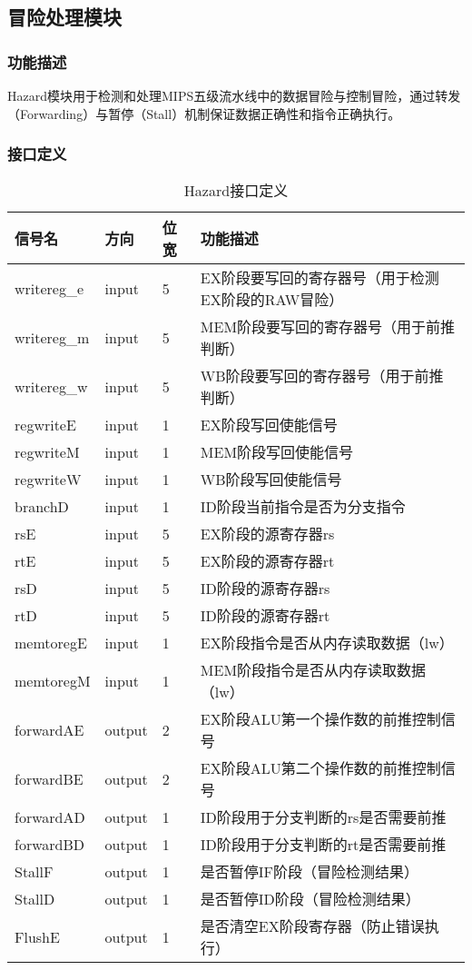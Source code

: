 \subsection{冒险处理模块}\label{sub:hazard}
\subsubsection{功能描述}
Hazard模块用于检测和处理MIPS五级流水线中的数据冒险与控制冒险，通过转发（Forwarding）与暂停（Stall）机制保证数据正确性和指令正确执行。
\subsubsection{接口定义}
\begin{table}[H]
\caption{Hazard接口定义}\label{tab:signaldef}
\begin{center}
	\begin{tabular}{|l|l|l|p{6cm}|}
	\hline
	\textbf{信号名} & \textbf{方向} & \textbf{位宽} & \textbf{功能描述}\\ \hline \hline
writereg\_e & input & 5 & EX阶段要写回的寄存器号（用于检测EX阶段的RAW冒险） \\
writereg\_m & input & 5 & MEM阶段要写回的寄存器号（用于前推判断） \\
writereg\_w & input & 5 & WB阶段要写回的寄存器号（用于前推判断） \\
regwriteE & input & 1 & EX阶段写回使能信号 \\
regwriteM & input & 1 & MEM阶段写回使能信号 \\
regwriteW & input & 1 & WB阶段写回使能信号 \\
branchD & input & 1 & ID阶段当前指令是否为分支指令 \\
rsE & input & 5 & EX阶段的源寄存器rs \\
rtE & input & 5 & EX阶段的源寄存器rt \\
rsD & input & 5 & ID阶段的源寄存器rs \\
rtD & input & 5 & ID阶段的源寄存器rt \\
memtoregE & input & 1 & EX阶段指令是否从内存读取数据（lw） \\
memtoregM & input & 1 & MEM阶段指令是否从内存读取数据（lw） \\
forwardAE & output & 2 & EX阶段ALU第一个操作数的前推控制信号 \\
forwardBE & output & 2 & EX阶段ALU第二个操作数的前推控制信号 \\
forwardAD & output & 1 & ID阶段用于分支判断的rs是否需要前推 \\
forwardBD & output & 1 & ID阶段用于分支判断的rt是否需要前推 \\
StallF & output & 1 & 是否暂停IF阶段（冒险检测结果） \\
StallD & output & 1 & 是否暂停ID阶段（冒险检测结果） \\
FlushE & output & 1 & 是否清空EX阶段寄存器（防止错误执行） \\
	\hline
	\end{tabular}
\end{center}
\end{table}
